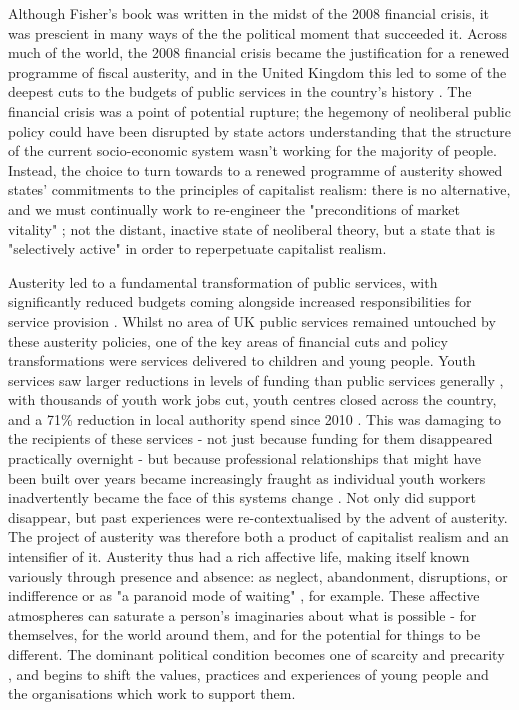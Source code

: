 Although Fisher's book was written in the midst of the 2008 financial crisis, it was prescient in many ways of the the political moment that succeeded it. Across much of the world, the 2008 financial crisis became the justification for a renewed programme of fiscal austerity, and in the United Kingdom this led to some of the deepest cuts to the budgets of public services in the country's history \citep{lowndes_local_2012}. The financial crisis was a point of potential rupture; the hegemony of neoliberal public policy could have been disrupted by state actors understanding that the structure of the current socio-economic system wasn't working for the majority of people. Instead, the choice to turn towards to a renewed programme of austerity showed states' commitments to the principles of capitalist realism: there is no alternative, and we must continually work to re-engineer the "preconditions of market vitality" \citep{connolly_fragility_2013}; not the distant, inactive state of neoliberal theory, but a state that is "selectively active" \citep{harvey_brief_2007} in order to reperpetuate capitalist realism.

Austerity led to a fundamental transformation of public services, with significantly reduced budgets coming alongside increased responsibilities for service provision \citep{clifford_charitable_2017, jones_uneven_2016}. Whilst no area of UK public services remained untouched by these austerity policies, one of the key areas of financial cuts and policy transformations were services delivered to children and young people. Youth services saw larger reductions in levels of funding than public services generally \citep{youdell_assembling_2015}, with thousands of youth work jobs cut, youth centres closed across the country, and a 71\% reduction in local authority spend since 2010 \citep{ymca_making_2020}. This was damaging to the recipients of these services - not just because funding for them disappeared practically overnight - but because professional relationships that might have been built over years became increasingly fraught as individual youth workers inadvertently became the face of this systems change \citep{clayton_distancing_2016}. Not only did support disappear, but past experiences were re-contextualised by the advent of austerity. The project of austerity was therefore both a product of capitalist realism and an intensifier of it. Austerity thus had a rich affective life, making itself known variously through presence and absence: as neglect, abandonment, disruptions, or indifference  \citep{raynor_dramatising_2017} or as "a paranoid mode of waiting" \citep{hitchen_affective_2019}, for example. These affective atmospheres can saturate a person's imaginaries about what is possible - for themselves, for the world around them, and for the potential for things to be different. The dominant political condition becomes one of scarcity and precarity \citep{berlant_cruel_2011}, and begins to shift the values, practices and experiences of young people and the organisations which work to support them. 

